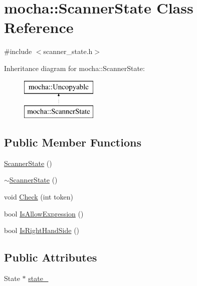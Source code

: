 \hypertarget{classmocha_1_1_scanner_state}{
\section{mocha::ScannerState Class Reference}
\label{classmocha_1_1_scanner_state}
}


{\ttfamily \#include $<$scanner\_\-state.h$>$}

Inheritance diagram for mocha::ScannerState:\begin{figure}[H]
\begin{center}
\leavevmode
\includegraphics[height=2.000000cm]{classmocha_1_1_scanner_state}
\end{center}
\end{figure}
\subsection*{Public Member Functions}
\begin{DoxyCompactItemize}
\item 
\hyperlink{classmocha_1_1_scanner_state_a6d11b9419d7dc490b7616ee4117df0a2}{ScannerState} ()
\item 
\hyperlink{classmocha_1_1_scanner_state_ade09ca7be5d720b48f46471db1f879f4}{$\sim$ScannerState} ()
\item 
void \hyperlink{classmocha_1_1_scanner_state_aaf35492d3f9f5dc8fe4871019e43c807}{Check} (int token)
\item 
bool \hyperlink{classmocha_1_1_scanner_state_ad4980720beaf8d0e59bb62f33601ffdf}{IsAllowExpression} ()
\item 
bool \hyperlink{classmocha_1_1_scanner_state_a6b625c3218542d42f9a4ec7e5b9736cb}{IsRightHandSide} ()
\end{DoxyCompactItemize}
\subsection*{Public Attributes}
\begin{DoxyCompactItemize}
\item 
State $\ast$ \hyperlink{classmocha_1_1_scanner_state_ab74a1f3f72ddcf67075df8f373c314c4}{state\_\-}
\end{DoxyCompactItemize}


